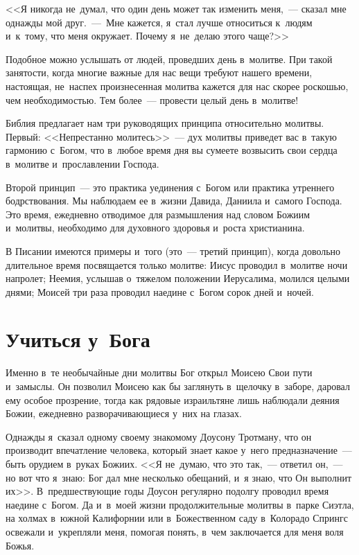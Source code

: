 \documentclass[12pt,article,a4paper,fittopage]{ncc}
\begin{document}
\begin{multicols}{2}
<<Я никогда не~думал, что один день может так изменить меня,~--- сказал мне однажды мой друг.~---~Мне кажется, я~стал лучше относиться к~людям и~к~тому, что меня окружает. Почему я~не~делаю этого чаще?>> 

Подобное можно услышать от людей, проведших день в~молитве. При такой занятости, когда многие важные для нас вещи требуют нашего времени, настоящая, не~наспех произнесенная молитва кажется для нас скорее роскошью, чем необходимостью. Тем более~--- провести целый день в~молитве!

Библия предлагает нам три руководящих принципа относительно молитвы. Первый: <<Непрестанно молитесь>>~--- дух молитвы приведет вас в~такую гармонию с~Богом, что в~любое время дня вы сумеете возвысить свои сердца в~молитве и~прославлении Господа.

Второй принцип~--- это практика уединения с~Богом или практика утреннего бодрствования. Мы наблюдаем ее в~жизни Давида, Даниила и~самого Господа. Это время, ежедневно отводимое для размышления над словом Божиим и~молитвы, необходимо для духовного здоровья и~роста христианина.

В Писании имеются примеры и~того (это~--- третий принцип), когда довольно длительное время посвящается только молитве: Иисус проводил в~молитве ночи напролет; Неемия, услышав о~тяжелом положении Иерусалима, молился целыми днями; Моисей три раза проводил наедине с~Богом сорок дней и~ночей.

\section*{Учиться у~Бога}

Именно в~те необычайные дни молитвы Бог открыл Моисею Свои пути и~замыслы. Он позволил Моисею как бы заглянуть в~щелочку в~заборе, даровал ему особое прозрение, тогда как рядовые израильтяне лишь наблюдали деяния Божии, ежедневно разворачивающиеся у~них на глазах.

Однажды я~сказал одному своему знакомому Доусону Тротману, что он производит впечатление человека, который знает какое у~него предназначение~--- быть орудием в~руках Божиих. <<Я не~думаю, что это так,~--- ответил он,~--- но вот что я~знаю: Бог дал мне несколько  обещаний, и~я знаю, что Он выполнит их>>. В~предшествующие годы Доусон регулярно подолгу проводил время наедине с~Богом. Да и~в~моей жизни продолжительные молитвы в~парке Сиэтла, на холмах в~южной Калифорнии или в~Божественном саду в~Колорадо Спрингс освежали и~укрепляли меня, помогая понять, в~чем заключается для меня воля Божья. 


\end{multicols}
\end{document}
